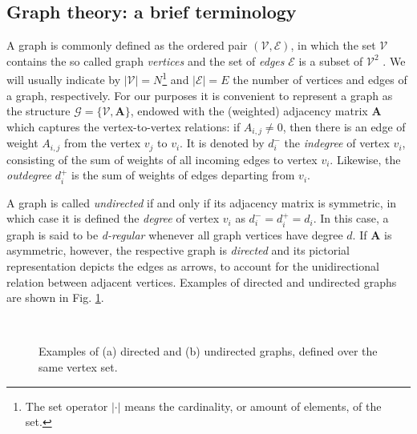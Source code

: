 \subsection{Graph theory: a brief terminology}

A graph is commonly defined as the ordered pair  $ (\mathcal{V},\mathcal{E}) $, in which the set $ \mathcal{V} $ contains the so called graph \emph{vertices} and the set of \emph{edges} $ \mathcal{E} $ is a subset of $ \mathcal{V}^2 $ \cite{feofiloff2011introduccao}.  We will usually indicate by $ |\mathcal{V}| = N $\footnote{The set operator $ |\cdot| $ means the cardinality, or amount of elements, of the set.} and $ |\mathcal{E}| = E $ the number of vertices and edges of a graph, respectively. For our purposes it is convenient to represent a graph as the structure $ \mathcal{G} = \{\mathcal{V}, \mathbf{A}\} $, endowed with the (weighted) adjacency matrix $ \mathbf{A} $ which captures the vertex-to-vertex relations: if $ A_{i,j} \neq 0$, then there is an edge of weight $ A_{i,j} $ from the vertex $ v_j $ to $ v_i $. It is denoted by $ d_i^- $ the \emph{indegree} of vertex $ v_i $, consisting of the sum of weights of all incoming edges to vertex $ v_i $. Likewise, the \emph{outdegree} $ d^+_i $ is the sum of weights of edges departing from $ v_i $.

A graph is called \emph{undirected} if and only if its adjacency matrix is symmetric, in which case it is defined the \emph{degree} of vertex $ v_i $ as $ d_i^- = d_i^+ = d_i $. In this case, a graph is said to be \emph{d-regular} whenever all graph vertices have degree $ d $\label{pag:regular}. If $ \mathbf{A} $ is asymmetric, however, the respective graph is \emph{directed} and its pictorial representation depicts the edges as arrows, to account for the unidirectional relation between adjacent vertices. Examples of directed and undirected graphs are shown in Fig. \ref{fig:example_graphs}.

\begin{figure}
	\centering
	~
	\caption{Examples of (a) directed and (b) undirected graphs, defined over the same vertex set.}
	\label{fig:example_graphs}
\end{figure}

